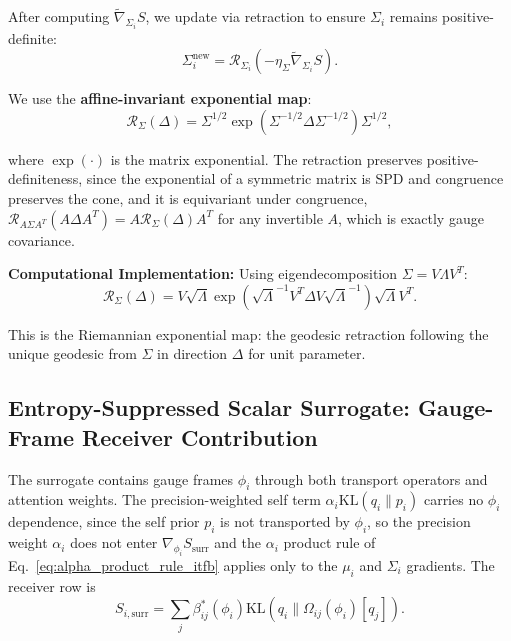\documentclass[11pt]{article}
\begin{document}
After computing $\tilde{\nabla}_{\Sigma_i} S$, we update via retraction to ensure $\Sigma_i$ remains positive-definite:
\begin{equation}
\Sigma_i^{\mathrm{new}} = \mathcal{R}_{\Sigma_i}(-\eta_\Sigma \tilde{\nabla}_{\Sigma_i} S).
\end{equation}

We use the \textbf{affine-invariant exponential map}:
\begin{equation}
\mathcal{R}_{\Sigma}(\Delta) = \Sigma^{1/2} \exp\left(\Sigma^{-1/2} \Delta \Sigma^{-1/2}\right) \Sigma^{1/2},
\end{equation}

where $\exp(\cdot)$ is the matrix exponential. The retraction preserves positive-definiteness, since the exponential of a symmetric matrix is SPD and congruence preserves the cone, and it is equivariant under congruence, $\mathcal{R}_{A\Sigma A^T}(A\Delta A^T) = A \mathcal{R}_{\Sigma}(\Delta) A^T$ for any invertible $A$, which is exactly gauge covariance.

\textbf{Computational Implementation:} Using eigendecomposition $\Sigma = V\Lambda V^T$:
\begin{equation}
\mathcal{R}_{\Sigma}(\Delta) = V \sqrt{\Lambda} \exp\left(\sqrt{\Lambda}^{-1} V^T \Delta V \sqrt{\Lambda}^{-1}\right) \sqrt{\Lambda} V^T.
\end{equation}

This is the Riemannian exponential map: the geodesic retraction following the unique geodesic from $\Sigma$ in direction $\Delta$ for unit parameter.

\subsection*{Entropy-Suppressed Scalar Surrogate: Gauge-Frame Receiver Contribution}

The surrogate contains gauge frames $\phi_i$ through both transport operators and attention weights. The precision-weighted self term $\alpha_i \mathrm{KL}(q_i \| p_i)$ carries no $\phi_i$ dependence, since the self prior $p_i$ is not transported by $\phi_i$, so the precision weight $\alpha_i$ does not enter $\nabla_{\phi_i} S_{\mathrm{surr}}$ and the $\alpha_i$ product rule of Eq.~\eqref{eq:alpha_product_rule_itfb} applies only to the $\mu_i$ and $\Sigma_i$ gradients. The receiver row is
\begin{equation}
S_{i,\mathrm{surr}} = \sum_j \beta_{ij}^*(\phi_i)\mathrm{KL}(q_i \| \Omega_{ij}(\phi_i)[q_j]).
\end{equation}
\end{document}
